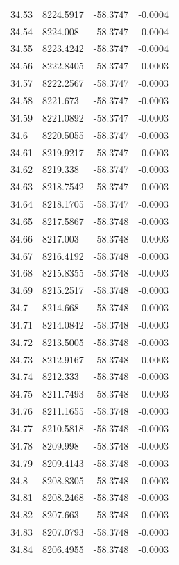 \begin{table}[H]
\begin{tabular}{llll}
34.53 & 8224.5917 & -58.3747 & -0.0004 \\
34.54 & 8224.008 & -58.3747 & -0.0004 \\
34.55 & 8223.4242 & -58.3747 & -0.0004 \\
34.56 & 8222.8405 & -58.3747 & -0.0003 \\
34.57 & 8222.2567 & -58.3747 & -0.0003 \\
34.58 & 8221.673 & -58.3747 & -0.0003 \\
34.59 & 8221.0892 & -58.3747 & -0.0003 \\
34.6 & 8220.5055 & -58.3747 & -0.0003 \\
34.61 & 8219.9217 & -58.3747 & -0.0003 \\
34.62 & 8219.338 & -58.3747 & -0.0003 \\
34.63 & 8218.7542 & -58.3747 & -0.0003 \\
34.64 & 8218.1705 & -58.3747 & -0.0003 \\
34.65 & 8217.5867 & -58.3748 & -0.0003 \\
34.66 & 8217.003 & -58.3748 & -0.0003 \\
34.67 & 8216.4192 & -58.3748 & -0.0003 \\
34.68 & 8215.8355 & -58.3748 & -0.0003 \\
34.69 & 8215.2517 & -58.3748 & -0.0003 \\
34.7 & 8214.668 & -58.3748 & -0.0003 \\
34.71 & 8214.0842 & -58.3748 & -0.0003 \\
34.72 & 8213.5005 & -58.3748 & -0.0003 \\
34.73 & 8212.9167 & -58.3748 & -0.0003 \\
34.74 & 8212.333 & -58.3748 & -0.0003 \\
34.75 & 8211.7493 & -58.3748 & -0.0003 \\
34.76 & 8211.1655 & -58.3748 & -0.0003 \\
34.77 & 8210.5818 & -58.3748 & -0.0003 \\
34.78 & 8209.998 & -58.3748 & -0.0003 \\
34.79 & 8209.4143 & -58.3748 & -0.0003 \\
34.8 & 8208.8305 & -58.3748 & -0.0003 \\
34.81 & 8208.2468 & -58.3748 & -0.0003 \\
34.82 & 8207.663 & -58.3748 & -0.0003 \\
34.83 & 8207.0793 & -58.3748 & -0.0003 \\
34.84 & 8206.4955 & -58.3748 & -0.0003 \\

\end{tabular}
\end{table}
